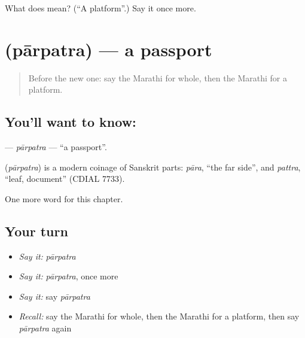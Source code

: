 \begin{tcolorbox}[breakable,colback=teal!4,colframe=teal!35!black,title={Before you move on}]
What does  mean? (\textquotedblleft{}A platform\textquotedblright{}.) Say it once more.
\end{tcolorbox}
\section[\texorpdfstring{\mr{पारपत्र} (pārpatra)}{पारपत्र (pārpatra)}]{ (pārpatra) — a passport}

\label{lesson:MR-C236-parpatra}



\begin{quote}
Before the new one: say the Marathi for whole, then the Marathi for a platform.
\end{quote}

\subsection*{You'll want to know: }
\textbf{} — \emph{pārpatra} — \textquotedblleft{}a passport\textquotedblright{}.

\begin{cousinweb}
\textbf{} (\emph{pārpatra}) is a modern coinage of Sanskrit parts: \emph{pāra}, \textquotedblleft{}the far side\textquotedblright{}, and \emph{pattra}, \textquotedblleft{}leaf, document\textquotedblright{} (CDIAL 7733).
\end{cousinweb}

\begin{grammarlens}[title={What you've built}]
One more word for this chapter.
\end{grammarlens}

\subsection*{Your turn}
\begin{itemize}
\raggedright
  \item \emph{Say it:} \emph{pārpatra}
  \item \emph{Say it:} \emph{pārpatra}, once more
  \item \emph{Say it:} say \emph{pārpatra}
  \item \emph{Recall:} say the Marathi for whole, then the Marathi for a platform, then say \emph{pārpatra} again
\end{itemize}

